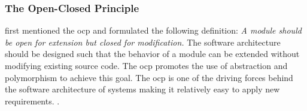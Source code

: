 \subsubsection{The Open-Closed Principle} \label{subsubsec_ocp}

\textcite{meyer_object-oriented_1988} first mentioned the \gls{ocp} and formulated the
following definition: \textit{A module should be open for extension but closed for
modification.} The software architecture should be designed such that the behavior of a
module can be extended without modifying existing source code. The \gls{ocp} promotes the
use of abstraction and polymorphism to achieve this goal. The \gls{ocp} is one of the
driving forces behind the software architecture of systems making it relatively easy to
apply new requirements. \parencite[94]{robert_c_martin_clean_2018}.
